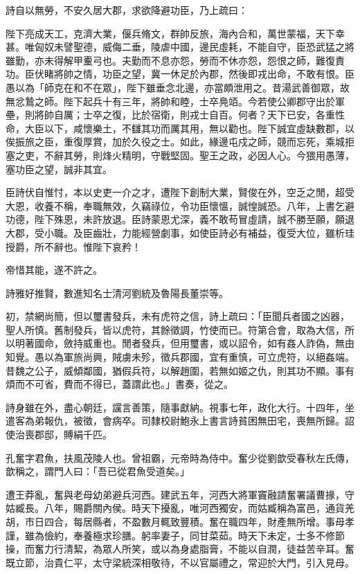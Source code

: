 \begin{pinyinscope}
詩自以無勞，不安久居大郡，求欲降避功臣，乃上疏曰：

陛下亮成天工，克濟大業，偃兵脩文，群帥反旅，海內合和，萬世蒙福，天下幸甚。唯匈奴未譬聖德，威侮二垂，陵虐中國，邊民虛耗，不能自守，臣恐武猛之將雖勤，亦未得解甲櫜弓也。夫勤而不息亦怨，勞而不休亦怨，怨恨之師，難復責功。臣伏睹將帥之情，功臣之望，冀一休足於內郡，然後即戎出命，不敢有恨。臣愚以為「師克在和不在眾」，陛下雖垂念北邊，亦當頗泄用之。昔湯武善御眾，故無忿鷙之師。陛下起兵十有三年，將帥和睦，士卒鳧竡。今若使公卿郡守出於軍壘，則將帥自厲；士卒之復，比於宿衛，則戎士自百。何者？天下已安，各重性命，大臣以下，咸懷樂土，不讎其功而厲其用，無以勸也。陛下誠宜虛缺數郡，以俟振旅之臣，重復厚賞，加於久役之士。如此，緣邊屯戍之師，競而忘死，乘城拒塞之吏，不辭其勞，則烽火精明，守戰堅固。聖王之政，必因人心。今猥用愚薄，塞功臣之望，誠非其宜。

臣詩伏自惟忖，本以史吏一介之才，遭陛下創制大業，賢俊在外，空乏之閒，超受大恩，收養不稱，奉職無效，久竊祿位，令功臣懷慍，誠惶誠恐。八年，上書乞避功德，陛下殊恩，未許放退。臣詩蒙恩尤深，義不敢苟冒虛請，誠不勝至願，願退大郡，受小職。及臣齒壯，力能經營劇事，如使臣詩必有補益，復受大位，雖析珪授爵，所不辭也。惟陛下哀矜！

帝惜其能，遂不許之。

詩雅好推賢，數進知名士清河劉統及魯陽長董崇等。

初，禁網尚簡，但以璽書發兵，未有虎符之信，詩上疏曰：「臣聞兵者國之凶器，聖人所慎。舊制發兵，皆以虎符，其餘徵調，竹使而已。符第合會，取為大信，所以明著國命，斂持威重也。閒者發兵，但用璽書，或以詔令，如有姦人詐偽，無由知覺。愚以為軍旅尚興，賊虜未殄，徵兵郡國，宜有重慎，可立虎符，以絕姦端。昔魏之公子，威傾鄰國，猶假兵符，以解趙圍，若無如姬之仇，則其功不顯。事有煩而不可省，費而不得已，蓋謂此也。」書奏，從之。

詩身雖在外，盡心朝廷，讜言善策，隨事獻納。視事七年，政化大行。十四年，坐遣客為弟報仇，被徵，會病卒。司隸校尉鮑永上書言詩貧困無田宅，喪無所歸。詔使治喪郡邸，賻絹千匹。

孔奮字君魚，扶風茂陵人也。曾祖霸，元帝時為侍中。奮少從劉歆受春秋左氏傳，歆稱之，謂門人曰：「吾已從君魚受道矣。」

遭王莽亂，奮與老母幼弟避兵河西。建武五年，河西大將軍竇融請奮署議曹掾，守姑臧長。八年，賜爵關內侯。時天下擾亂，唯河西獨安，而姑臧稱為富邑，通貨羌胡，市日四合，每居縣者，不盈數月輒致豐積。奮在職四年，財產無所增。事母孝謹，雖為儉約，奉養極求珍膳。躬率妻子，同甘菜茹。時天下未定，士多不修節操，而奮力行清絜，為眾人所笑，或以為身處脂膏，不能以自潤，徒益苦辛耳。奮既立節，治貴仁平，太守梁統深相敬待，不以官屬禮之，常迎於大門，引入見母。


\end{pinyinscope}

